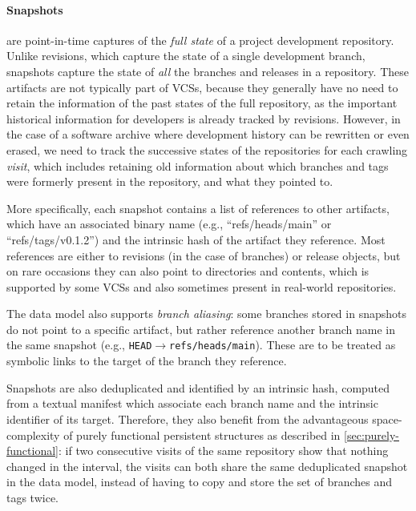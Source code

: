 \begin{figure}\centering
{}
\end{figure}
\paragraph{\textbf{Snapshots}} are point-in-time captures of the \emph{full
state} of a project development repository. Unlike revisions, which capture the
state of a single development branch, snapshots capture the state of \emph{all}
the branches and releases in a repository. These artifacts are not typically
part of \glspl{VCS}, because they generally have no need to retain the
information of the past states of the full repository, as the important
historical information for developers is already tracked by revisions. However,
in the case of a software archive where development history can be rewritten or
even erased, we need to track the successive states of the repositories for
each crawling \emph{visit}, which includes retaining old information about
which branches and tags were formerly present in the repository, and what they
pointed to.

More specifically, each snapshot contains a list of references to other
artifacts, which have an associated binary name (e.g., ``refs/heads/main'' or
``refs/tags/v0.1.2'') and the intrinsic hash of the artifact they reference.
Most references are either to revisions (in the case of branches) or release
objects, but on rare occasions they can also point to directories and
contents, which is supported by some \glspl{VCS} and also sometimes present in
real-world repositories.

The data model also supports \emph{branch aliasing}: some branches stored in
snapshots do not point to a specific artifact, but rather reference another
branch name in the same snapshot (e.g.,
\texttt{HEAD}$\to$\texttt{refs/heads/main}). These are to be treated as
symbolic links to the target of the branch they reference.

Snapshots are also deduplicated and identified by an intrinsic hash, computed
from a textual manifest which associate each branch name and the intrinsic
identifier of its target. Therefore, they also benefit from the advantageous
space-complexity of purely functional persistent structures as described in
\cref{sec:purely-functional}: if two consecutive visits of the same repository
show that nothing changed in the interval, the visits can both share the same
deduplicated snapshot in the data model, instead of having to copy and store
the set of branches and tags twice.


